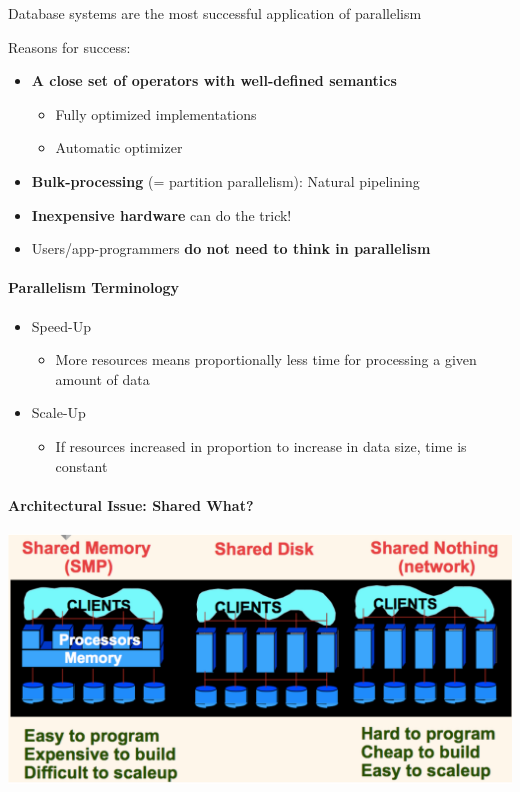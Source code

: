 Database systems are the most successful application of parallelism

Reasons for success:
\begin{itemize}
\item \textbf{A close set of operators with well-defined semantics}
  \begin{itemize}
  \item Fully optimized implementations
  \item Automatic optimizer
  \end{itemize}

\item \textbf{Bulk-processing} (= partition parallelism):
  Natural pipelining
\item \textbf{Inexpensive hardware} can do the trick!
\item Users/app-programmers
  \textbf{do not need to think in parallelism}
\end{itemize}


\paragraph{Parallelism Terminology}

\begin{itemize}
\item Speed-Up
  \begin{itemize}
  \item More resources means proportionally less time for
    processing a given amount of data
  \end{itemize}

\item Scale-Up
  \begin{itemize}
  \item If resources increased in proportion to
    increase in data size, time is constant
  \end{itemize}
\end{itemize}


\paragraph{Architectural Issue: Shared What?}

\includegraphics[scale=0.2]{graphics/shared-what.png}

